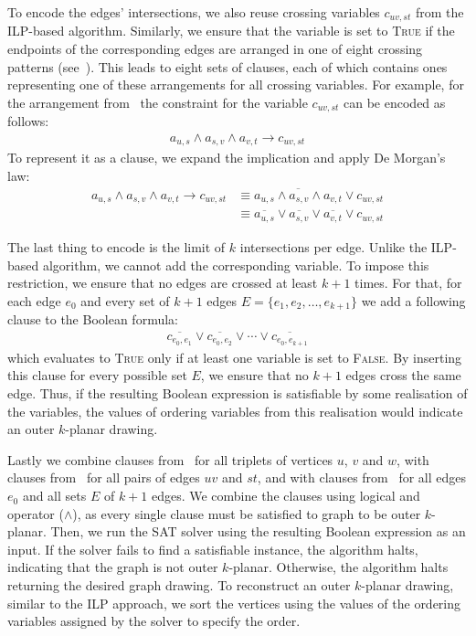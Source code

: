 To encode the edges' intersections, we also reuse crossing variables \(c_{uv, st}\) from the ILP-based algorithm. Similarly, we ensure that the variable is set to \textsc{True} if the endpoints of the corresponding edges are arranged in one of eight crossing patterns (see~). This leads to eight sets of clauses, each of which contains ones representing one of these arrangements for all crossing variables. For example, for the arrangement from~ the constraint for the variable \(c_{uv, st}\) can be encoded as follows:
\begin{align*}
    a_{u,s} \land a_{s,v} \land a_{v,t} \rightarrow c_{uv, st}
\end{align*}
To represent it as a clause, we expand the implication and apply De Morgan's law:
\begin{align}
    a_{u,s} \land a_{s,v} \land a_{v,t} \rightarrow c_{uv, st}
    & \equiv \overline{a_{u,s} \land a_{s,v} \land a_{v,t}} \lor c_{uv, st} \nonumber \\
    & \equiv \overline{a_{u,s}} \lor \overline{a_{s,v}} \lor \overline{a_{v,t}} \lor c_{uv, st} \label{sat:crossing-vars}
\end{align}

The last thing to encode is the limit of \(k\) intersections per edge. Unlike the ILP-based algorithm, we cannot add the corresponding variable. To impose this restriction, we ensure that no edges are crossed at least \(k+1\) times. For that, for each edge \(e_0\) and every set of \(k+1\) edges \(E = \{e_1, e_2, \dots, e_{k+1}\}\) we add a following clause to the Boolean formula:
\begin{align}
    \overline{c_{e_0, e_1}} \lor \overline{c_{e_0, e_2}} \lor \cdots \lor \overline{c_{e_0, e_{k+1}}} \label{sat:cr-limit}
\end{align}
which evaluates to \textsc{True} only if at least one variable is set to \textsc{False}. By inserting this clause for every possible set \(E\), we ensure that no \(k+1\) edges cross the same edge. Thus, if the resulting Boolean expression is satisfiable by some realisation of the variables, the values of ordering variables from this realisation would indicate an outer \(k\)-planar drawing.

Lastly we combine clauses from~ for all triplets of vertices \(u\), \(v\) and \(w\), with clauses from~ for all pairs of edges \(uv\) and \(st\), and with clauses from~ for all edges \(e_0\) and all sets \(E\) of \(k+1\) edges. We combine the clauses using logical and operator (\(\land\)), as every single clause must be satisfied to graph to be outer \(k\)-planar. Then, we run the SAT solver using the resulting Boolean expression as an input. If the solver fails to find a satisfiable instance, the algorithm halts, indicating that the graph is not outer \(k\)-planar. Otherwise, the algorithm halts returning the desired graph drawing. To reconstruct an outer \(k\)-planar drawing, similar to the ILP approach, we sort the vertices using the values of the ordering variables assigned by the solver to specify the order.


